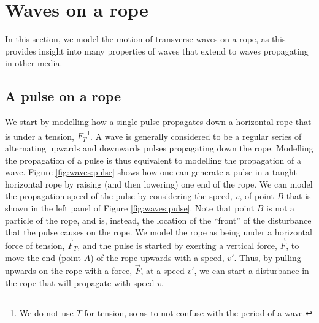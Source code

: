 \section{Waves on a rope}
In this section, we model the motion of transverse waves on a rope, as this provides insight into many properties of waves that extend to waves propagating in other media. 

\subsection{A pulse on a rope}
We start by modelling how a single pulse propagates down a horizontal rope that is under a tension, $F_T$\footnote{We do not use $T$ for tension, so as to not confuse with the period of a wave.}. A wave is generally considered to be a regular series of alternating upwards and downwards pulses propagating down the rope. Modelling the propagation of a pulse is thus equivalent to modelling the propagation of a wave. Figure \ref{fig:waves:pulse} shows how one can generate a pulse in a taught horizontal rope by raising (and then lowering) one end of the rope.
We can model the propagation speed of the pulse by considering the speed, $v$, of point $B$ that is shown in the left panel of Figure \ref{fig:waves:pulse}. Note that point $B$ is not a particle of the rope, and is, instead, the location of the ``front'' of the disturbance that the pulse causes on the rope. We model the rope as being under a horizontal force of tension, $\vec F_T$, and the pulse is started by exerting a vertical force, $\vec F$, to move the end (point $A$) of the rope upwards with a speed, $v'$. Thus, by pulling upwards on the rope with a force, $\vec F$, at a speed $v'$, we can start a disturbance in the rope that will propagate with speed $v$. 

